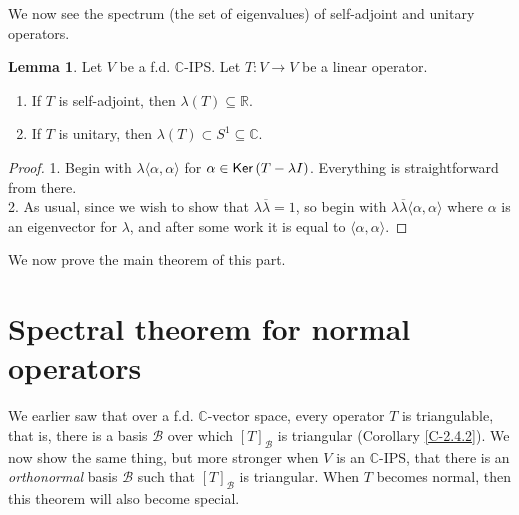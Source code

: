 \documentclass[letterpaper,11pt,twoside]{article}
\theoremstyle{definition}
\theoremstyle{definition}
\theoremstyle{definition}
\theoremstyle{definition}
\newtheorem{lemma}[proposition]{\textbf{Lemma}}
\theoremstyle{definition}
\theoremstyle{definition}
\theoremstyle{remark}
\theoremstyle{definition}
\newcommand{\Ker}[1]{{\fontfamily{lmss}\selectfont 
		\text{Ker}\left (#1\right )
}}
\newcommand{\R}[0]{\mathbb{R}}
\newcommand{\ip}[2]{\langle #1,#2 \rangle}
\newcommand{\conj}[1]{\overline{#1}}
\newcommand{\C}{\mathbb{C}}
\begin{document}
	We now see the spectrum (the set of eigenvalues) of self-adjoint and unitary operators.
	\begin{lemma}\label{L-5.1.7}
		Let $ V $ be a f.d. $ \C $-IPS. Let $ T:V\to V $ be a linear operator.
		\begin{enumerate}
			\item {If $ T $ is self-adjoint, then $ \lambda(T) \subseteq \R $.}
			\item {If $ T $ is unitary, then $ \lambda(T) \subset S^{1} \subseteq \C$.}
		\end{enumerate}
	\end{lemma}
    \begin{proof}
    	1. Begin with $ \lambda\ip{\alpha}{\alpha} $ for $ \alpha \in \Ker{T-\lambda I} $. Everything is straightforward from there.\\
    	2. As usual, since we wish to show that $ \lambda\conj{\lambda} =1 $, so begin with $ \lambda \conj{\lambda}\ip{\alpha}{\alpha} $ where $ \alpha $ is an eigenvector for $ \lambda $, and after some work it is equal to $ \ip{\alpha}{\alpha} $.
    \end{proof}
	We now prove the main theorem of this part. 
    \section{Spectral theorem for normal operators}
    We earlier saw that over a f.d. $ \C $-vector space, every operator $ T $ is triangulable, that is, there is a basis $ \mathcal{B} $ over which $ [T]_{\mathcal{B}} $ is triangular (Corollary \ref{C-2.4.2}). We now show the same thing, but more stronger when $ V $ is an $ \C $-IPS, that there is an \textit{orthonormal} basis $ \mathcal{B} $ such that $ [T]_{\mathcal{B}} $ is triangular. When $ T $ becomes normal, then this theorem will also become special.\\
    
\end{document}
